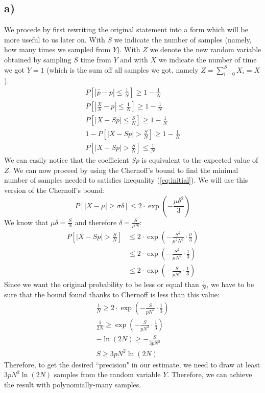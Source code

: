\documentclass[11pt,a4paper]{article}
\begin{document}
\subsection*{a)}
We procede by first rewriting the original statement into a form which will be more
useful to us later on. With $S$ we indicate the number of samples (namely, how many times
we sampled from $Y$). With $Z$ we denote the new random variable obtained by sampling $S$ time from $Y$ and with $X$ we indicate the number of time we got $Y=1$ (which is the sum off all samples we got, namely $Z = \sum_{i=0}^{S} X_i = X$). 
\begin{gather}
\label{eq:initial}
P[|\hat{p}-p| \leq \frac{1}{N}] \geq 1-\frac{1}{N} \\
P[|\frac{X}{S}-p|\leq \frac{1}{N}] \geq 1-\frac{1}{N}\\
P[|X-Sp|\leq \frac{S}{N}] \geq 1-\frac{1}{N}\\
1 - P[|X-Sp| > \frac{S}{N}] \geq 1-\frac{1}{N}\\
P[|X-Sp| > \frac{S}{N}] \leq \frac{1}{N}
\end{gather}
We can easily notice that the coefficient $Sp$ is equivalent to the expected value of $Z$. 
We can now proceed by using the Chernoff's bound to find the minimal number of samples needed to
satisfies inequality (\ref{eq:initial}). We will use this version of the Chernoff's bound:
\begin{equation}
P[|X-\mu|\geq \sigma\delta] \leq 2\cdot \exp(-\frac{\mu\delta^2}{3})
\end{equation}
We know that $\mu\delta = \frac{S}{N}$ and therefore $\delta = \frac{S}{\mu N}$:
\begin{align}
P[|X-Sp| > \frac{S}{N}] &\leq 2 \cdot \exp (-\frac{S^2}{\mu^2 N^2}\cdot \frac{\mu}{3})\\
&\leq  2 \cdot \exp(-\frac{S^2}{\mu N^2 }\cdot \frac{1}{3})\\
&\leq  2 \cdot \exp(-\frac{S}{p N^2 }\cdot \frac{1}{3})
\end{align}
Since we want the original probability to be less or equal than $\frac{1}{N}$, we have to be sure that the bound found thanks 
to Chernoff is less than this value:
\begin{gather}
\frac{1}{N} \geq  2 \cdot \exp(-\frac{S}{p N^2 }\cdot \frac{1}{3})\\
\frac{1}{2N} \geq \exp(-\frac{S}{p N^2 }\cdot \frac{1}{3})\\
-\ln(2N) \geq -\frac{S}{3p N^2 }\\
S \geq 3pN^2 \ln(2N)
\end{gather} 
Therefore, to get the desired ``precision" in our estimate, we need to draw at least $3pN^2\ln(2N)$ samples
from the random variable $Y$. Therefore, we can achieve the result with polynomially-many samples.
\newpage
\end{document}
